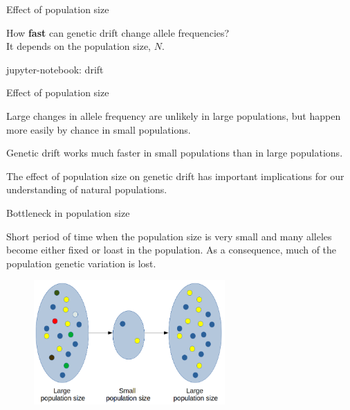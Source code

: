 \begin{frame}{Effect of population size}

	How \textbf{fast} can genetic drift change allele frequencies? \\
	It depends on the population size, $N$.

	\bigskip
	\tiny{jupyter-notebook: drift}
	\bigskip

\end{frame}

\begin{frame}{Effect of population size}

	Large changes in allele frequency are unlikely in large populations, but happen more easily by chance
	in small populations.

	\begin{block}{}
		Genetic drift works much faster in small populations than in large populations.
	\end{block}

	\bigskip

	The effect of population size on genetic drift has important implications for our understanding
	of natural populations.

\end{frame}

\begin{frame}{Bottleneck in population size}

	\small
	\begin{block}{}
		Short period of time when the population size is very small and many alleles become either fixed or loast in the population. As a consequence, much of the population genetic variation is lost.
	\end{block}

	\begin{figure}
                \includegraphics[width=0.65\textwidth]{Pics/bottleneck}
        \end{figure}

\end{frame}


